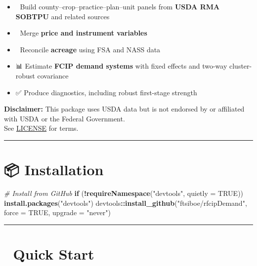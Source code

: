 \documentclass[
]{article}
\newenvironment{Shaded}{\begin{snugshade}}{\end{snugshade}}
\newcommand{\AttributeTok}[1]{\textcolor[rgb]{0.13,0.29,0.53}{#1}}
\newcommand{\CommentTok}[1]{\textcolor[rgb]{0.56,0.35,0.01}{\textit{#1}}}
\newcommand{\ConstantTok}[1]{\textcolor[rgb]{0.56,0.35,0.01}{#1}}
\newcommand{\ControlFlowTok}[1]{\textcolor[rgb]{0.13,0.29,0.53}{\textbf{#1}}}
\newcommand{\FunctionTok}[1]{\textcolor[rgb]{0.13,0.29,0.53}{\textbf{#1}}}
\newcommand{\NormalTok}[1]{#1}
\newcommand{\SpecialCharTok}[1]{\textcolor[rgb]{0.81,0.36,0.00}{\textbf{#1}}}
\newcommand{\StringTok}[1]{\textcolor[rgb]{0.31,0.60,0.02}{#1}}
\providecommand{\tightlist}{%
  \setlength{\itemsep}{0pt}\setlength{\parskip}{0pt}}
\begin{document}
\begin{itemize}
\tightlist
\item
  🧩 Build county--crop--practice--plan--unit panels from \textbf{USDA
  RMA SOBTPU} and related sources\\
\item
  🔗 Merge \textbf{price and instrument variables}\\
\item
  🌾 Reconcile \textbf{acreage} using FSA and NASS data\\
\item
  📊 Estimate \textbf{FCIP demand systems} with fixed effects and
  two-way cluster-robust covariance\\
\item
  ✅ Produce diagnostics, including robust first-stage strength
\end{itemize}

\textbf{Disclaimer:} This package uses USDA data but is not endorsed by
or affiliated with USDA or the Federal Government.\\
See \url{LICENSE} for terms.

\begin{center}\rule{0.5\linewidth}{0.5pt}\end{center}

\section{📦 Installation}\label{installation}

\begin{Shaded}
\begin{Highlighting}[]
\CommentTok{\# Install from GitHub}
\ControlFlowTok{if}\NormalTok{ (}\SpecialCharTok{!}\FunctionTok{requireNamespace}\NormalTok{(}\StringTok{"devtools"}\NormalTok{, }\AttributeTok{quietly =} \ConstantTok{TRUE}\NormalTok{)) }\FunctionTok{install.packages}\NormalTok{(}\StringTok{"devtools"}\NormalTok{)}
\NormalTok{devtools}\SpecialCharTok{::}\FunctionTok{install\_github}\NormalTok{(}\StringTok{"ftsiboe/rfcipDemand"}\NormalTok{, }\AttributeTok{force =} \ConstantTok{TRUE}\NormalTok{, }\AttributeTok{upgrade =} \StringTok{"never"}\NormalTok{)}
\end{Highlighting}
\end{Shaded}

\begin{center}\rule{0.5\linewidth}{0.5pt}\end{center}

\section{🚀 Quick Start}\label{quick-start}
\end{document}
